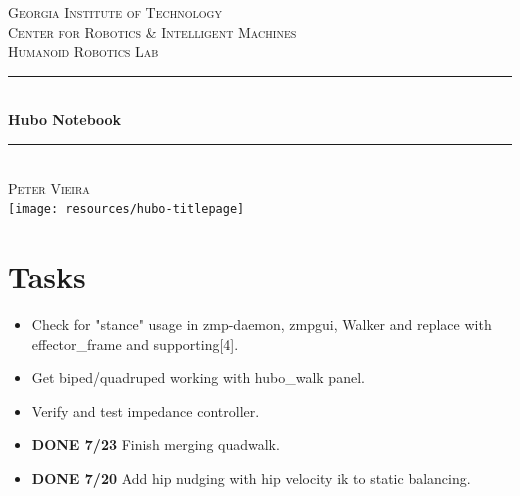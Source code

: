 \documentclass[letterpaper, 10 pt]{report}
\begin{document}
\begin{titlepage}
\center
\textsc{\LARGE Georgia Institute of Technology}\\[1.5cm]
\textsc{\large Center for Robotics \& Intelligent Machines}\\[0.5cm]
\textsc{\large Humanoid Robotics Lab}\\[0.5cm]
\rule{\linewidth}{0.5mm}\\[0.4cm]
{\huge \bfseries Hubo Notebook}\\[0.4cm]
\rule{\linewidth}{0.5mm}\\[1.5cm]
\textsc{\normalsize Peter Vieira}\\[1.5cm]
\texttt{[image: resources/hubo-titlepage]}
\vfill
\end{titlepage}


\section*{Tasks}
\begin{itemize}
\item Check for "stance" usage in zmp-daemon, zmpgui, Walker and replace with effector\_frame and supporting[4].
\item Get biped/quadruped working with hubo\_walk panel.
\item Verify and test impedance controller.
\item \textbf{DONE 7/23} Finish merging quadwalk.
\item \textbf{DONE 7/20} Add hip nudging with hip velocity ik to static balancing.
\end{itemize}
\end{document}
